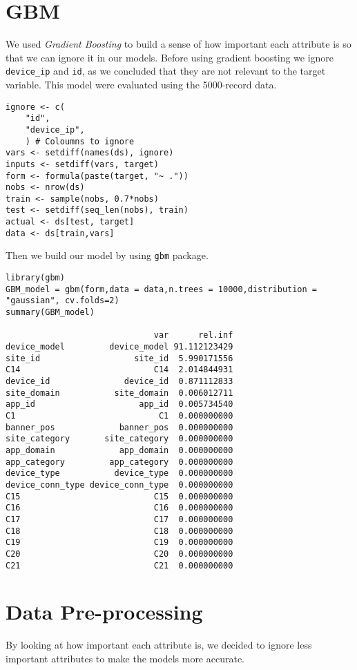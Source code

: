 \documentclass[11pt,a4paper]{article}
\begin{document}
\section{GBM}
\label{sec-2}
We used \emph{Gradient Boosting} to build a sense of how important
each attribute is so that we can ignore it in our models. Before using gradient
boosting we ignore \texttt{device\_ip} and \texttt{id}, as we concluded that they
are not relevant to the target variable. This model were evaluated
using the 5000-record data.

\begin{verbatim}
ignore <- c(
    "id",
    "device_ip",
    ) # Coloumns to ignore
vars <- setdiff(names(ds), ignore)
inputs <- setdiff(vars, target)
form <- formula(paste(target, "~ ."))
nobs <- nrow(ds)
train <- sample(nobs, 0.7*nobs)
test <- setdiff(seq_len(nobs), train)
actual <- ds[test, target]
data <- ds[train,vars]
\end{verbatim}

Then we build our model by using \texttt{gbm} package.

\begin{verbatim}
library(gbm)
GBM_model = gbm(form,data = data,n.trees = 10000,distribution = "gaussian", cv.folds=2)
summary(GBM_model)

                              var      rel.inf
device_model         device_model 91.112123429
site_id                   site_id  5.990171556
C14                           C14  2.014844931
device_id               device_id  0.871112833
site_domain           site_domain  0.006012711
app_id                     app_id  0.005734540
C1                             C1  0.000000000
banner_pos             banner_pos  0.000000000
site_category       site_category  0.000000000
app_domain             app_domain  0.000000000
app_category         app_category  0.000000000
device_type           device_type  0.000000000
device_conn_type device_conn_type  0.000000000
C15                           C15  0.000000000
C16                           C16  0.000000000
C17                           C17  0.000000000
C18                           C18  0.000000000
C19                           C19  0.000000000
C20                           C20  0.000000000
C21                           C21  0.000000000
\end{verbatim}

\section{Data Pre-processing}
\label{sec-3}
By looking at how important each attribute is, we decided to ignore 
less important attributes to make the models more accurate.
\end{document}
